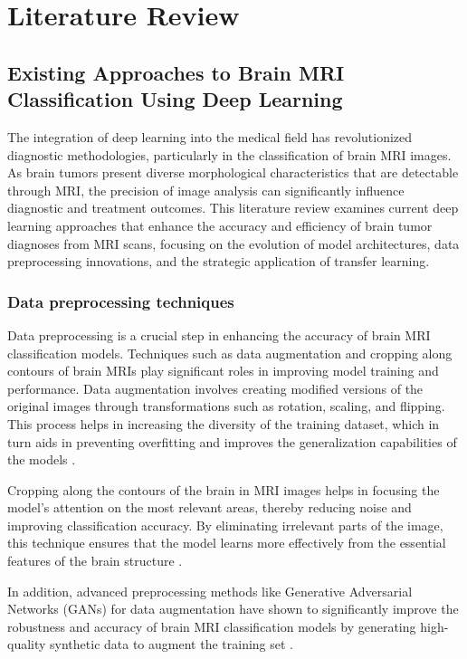 \section{Literature Review}\label{s:lit_review}

\subsection{Existing Approaches to Brain MRI Classification Using Deep Learning}

The integration of deep learning into the medical field has revolutionized diagnostic methodologies, particularly in the classification of brain MRI images. As brain tumors present diverse morphological characteristics that are detectable through MRI, the precision of image analysis can significantly influence diagnostic and treatment outcomes. This literature review examines current deep learning approaches that enhance the accuracy and efficiency of brain tumor diagnoses from MRI scans, focusing on the evolution of model architectures, data preprocessing innovations, and the strategic application of transfer learning.

\subsubsection{Data preprocessing techniques}

Data preprocessing is a crucial step in enhancing the accuracy of brain MRI classification models. Techniques such as data augmentation \cite{10183465} and cropping along contours of brain MRIs play significant roles in improving model training and performance. Data augmentation involves creating modified versions of the original images through transformations such as rotation, scaling, and flipping. This process helps in increasing the diversity of the training dataset, which in turn aids in preventing overfitting and improves the generalization capabilities of the models \cite{Paul2017Deep}.

Cropping along the contours of the brain in MRI images helps in focusing the model’s attention on the most relevant areas, thereby reducing noise and improving classification accuracy. By eliminating irrelevant parts of the image, this technique ensures that the model learns more effectively from the essential features of the brain structure \cite{Asif2022Improving}.

In addition, advanced preprocessing methods like Generative Adversarial Networks (GANs) for data augmentation have shown to significantly improve the robustness and accuracy of brain MRI classification models by generating high-quality synthetic data to augment the training set \cite{Fahimi2020Generative}.

